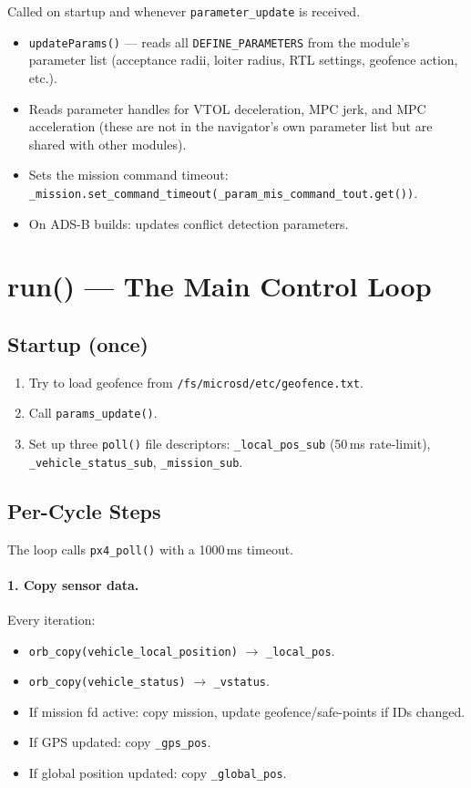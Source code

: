 \documentclass[12pt,a4paper]{article}
\begin{document}
Called on startup and whenever \texttt{parameter\_update} is received.
\begin{itemize}
  \item \texttt{updateParams()} --- reads all \texttt{DEFINE\_PARAMETERS} from
        the module's parameter list (acceptance radii, loiter radius,
        RTL settings, geofence action, etc.).
  \item Reads parameter handles for VTOL deceleration, MPC jerk, and MPC
        acceleration (these are not in the navigator's own parameter list but
        are shared with other modules).
  \item Sets the mission command timeout:
        \texttt{\_mission.set\_command\_timeout(\_param\_mis\_command\_tout.get())}.
  \item On ADS-B builds: updates conflict detection parameters.
\end{itemize}

\section{run() --- The Main Control Loop}

\subsection{Startup (once)}
\begin{enumerate}
  \item Try to load geofence from \texttt{/fs/microsd/etc/geofence.txt}.
  \item Call \texttt{params\_update()}.
  \item Set up three \texttt{poll()} file descriptors:
        \texttt{\_local\_pos\_sub} (50\,ms rate-limit),
        \texttt{\_vehicle\_status\_sub},
        \texttt{\_mission\_sub}.
\end{enumerate}

\subsection{Per-Cycle Steps}

The loop calls \texttt{px4\_poll()} with a 1000\,ms timeout.

\paragraph{1. Copy sensor data.}
Every iteration:
\begin{itemize}
  \item \texttt{orb\_copy(vehicle\_local\_position)} $\to$ \texttt{\_local\_pos}.
  \item \texttt{orb\_copy(vehicle\_status)} $\to$ \texttt{\_vstatus}.
  \item If mission fd active: copy mission, update geofence/safe-points if IDs changed.
  \item If GPS updated: copy \texttt{\_gps\_pos}.
  \item If global position updated: copy \texttt{\_global\_pos}.
\end{itemize}
\end{document}
